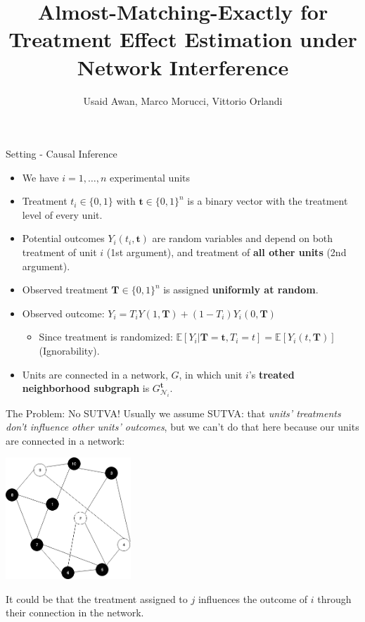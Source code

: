 \documentclass[newPxFont,numfooter,sectionpages]{beamer}
\title{Almost-Matching-Exactly for Treatment Effect Estimation under Network Interference}
\subtitle{}
\author{Usaid Awan, Marco Morucci, Vittorio Orlandi}
\date{}
\newcommand{\E}{\mathbb{E}}
\newcommand{\bt}{\mathbf{t}}
\newcommand{\bT}{\mathbf{T}}
\newcommand{\Gnit}{G_{\mathcal{N}_i}^\bt}
\begin{document}
 
\maketitle


\begin{frame}{Setting - Causal Inference}
\begin{itemize}
  \item We have $i=1, \dots, n$ experimental units
  \item Treatment $t_i \in \{0, 1\}$ with $\bt \in \{0, 1\}^n$ is a binary vector with the treatment level of every unit.
  \item Potential outcomes $Y_i(t_i, \bt)$ are random variables and depend on both treatment of unit $i$ (1st argument), and treatment of \textbf{all other units} (2nd argument).
  \item Observed treatment $\bT \in \{0, 1\}^n$ is assigned \textbf{uniformly at random}.
  \item Observed outcome: $Y_i = T_iY(1, \bT) + (1-T_i)Y_i(0, \bT)$
  \begin{itemize}
    \item Since treatment is randomized: $\E[Y_i|\bT = \bt, T_i = t] = \E[Y_i(t, \bT)]$ (Ignorability).
  \end{itemize}
  \item Units are connected in a network, $G$, in which unit $i$'s \textbf{treated neighborhood subgraph} is $\Gnit$.
\end{itemize}
\end{frame}

\begin{frame}{The Problem: No SUTVA!}
Usually we assume SUTVA: that \textit{units' treatments don't influence other units' outcomes}, but we can't do that here because our units are connected in a network:
\begin{center}
\includegraphics[height=1.8in]{graph1.png}
\end{center}
It could be that the treatment assigned to $j$ influences the outcome of $i$ through their connection in the network.
\end{frame}
\end{document}
